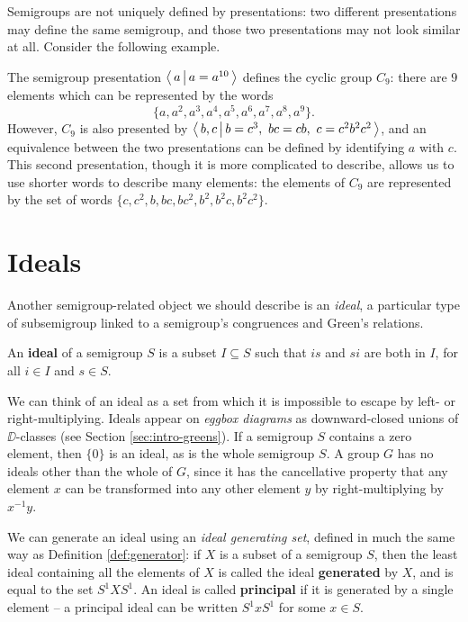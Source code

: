 Semigroups are not uniquely defined by presentations: two different
presentations may define the same semigroup, and those two presentations may not
look similar at all.  Consider the following example.

\begin{example}
  The semigroup presentation $\left\langle\,a\,\middle|\,a=a^{10}\,\right\rangle$ defines the cyclic group
  $C_9$: there are $9$ elements which can be represented by the words
  $$\{a, a^2, a^3, a^4, a^5, a^6, a^7, a^8, a^9\}.$$  However, $C_9$ is also
  presented by $\pres{b,c}{b=c^3,\ bc=cb,\ c=c^2b^2c^2}$, and an equivalence
  between the two presentations can be defined by identifying $a$ with $c$.
  This second presentation, though it is more complicated to describe, allows us
  to use shorter words to describe many elements: the elements of $C_9$ are
  represented by the set of words $\{c, c^2, b, bc, bc^2, b^2, b^2c, b^2c^2\}$.
\end{example}

\section{Ideals}
\label{sec:intro-ideals}

Another semigroup-related object we should describe is an \textit{ideal}, a
particular type of subsemigroup linked to a semigroup's congruences and Green's
relations.

\begin{definition}
  An \textbf{ideal} of a semigroup $S$ is a subset $I \subseteq S$ such that
  $is$ and $si$ are both in $I$, for all $i \in I$ and $s \in S$.
\end{definition}

We can think of an ideal as a set from which it is impossible to escape by left-
or right-multiplying.  Ideals appear on \textit{eggbox diagrams} as
downward-closed unions of $\DD$-classes (see Section \ref{sec:intro-greens}).
If a semigroup $S$ contains a zero element, then $\{0\}$ is an ideal, as is the
whole semigroup $S$.  A group $G$ has no ideals other than the whole of $G$,
since it has the cancellative property that any element $x$ can be transformed
into any other element $y$ by right-multiplying by $x^{-1}y$.

We can generate an ideal using an \textit{ideal generating set}, defined in much
the same way as Definition \ref{def:generator}: if $X$ is a subset of a
semigroup $S$, then the least ideal containing all the elements of $X$ is called
the ideal \textbf{generated} by $X$, and is equal to the set $S^1XS^1$.  An
ideal is called \textbf{principal} if it is generated by a single element -- a
principal ideal can be written $S^1xS^1$ for some $x \in S$.

